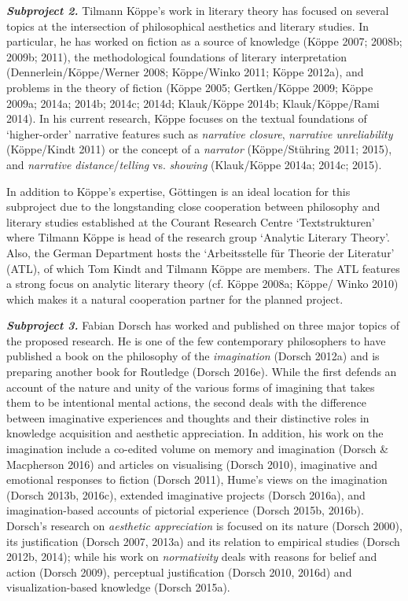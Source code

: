 \vspace{.2cm}
\noindent \textbf{\emph{Subproject 2.}} Tilmann K\"oppe's work in literary theory has focused on several topics at the intersection of philosophical aesthetics and literary studies. In particular, he has worked on fiction as a source of knowledge (K\"oppe 2007; 2008b; 2009b; 2011), the methodological foundations of literary interpretation (Dennerlein/K\"oppe/Werner 2008; K\"oppe/Winko 2011; K\"oppe 2012a), and problems in the theory of fiction (K\"oppe 2005; Gertken/K\"oppe 2009; K\"oppe 2009a; 2014a; 2014b; 2014c; 2014d; Klauk/K\"oppe 2014b; Klauk/K\"oppe/Rami 2014). In his current research, K\"oppe focuses on the textual foundations of `higher-order' narrative features such as \emph{narrative closure}, \emph{narrative unreliability} (K\"oppe/Kindt 2011) or the concept of a \emph{narrator} (K\"oppe/St\"uhring 2011; 2015), and \emph{narrative distance}/\emph{telling} vs. \emph{showing} (Klauk/K\"oppe 2014a; 2014c; 2015). 

In addition to K\"oppe's expertise, G\"ottingen is an ideal location for this subproject due to the longstanding close cooperation between philosophy and literary studies established at the Courant Research Centre `Textstrukturen' where Tilmann K\"oppe is head of the research group `Analytic Literary Theory'. Also, the German Department hosts the `Arbeitsstelle f\"ur Theorie der Literatur' (ATL), of which Tom Kindt and Tilmann K\"oppe are members. The ATL features a strong focus on analytic literary theory (cf. K\"oppe 2008a; K\"oppe/ Winko 2010) which makes it a natural cooperation partner for the planned project.

\vspace{.2cm}
\noindent \textbf{\emph{Subproject 3.}} Fabian Dorsch has worked and published on three major topics of the proposed research. He is one of the few contemporary philosophers to have published a book on the philosophy of the \emph{imagination} (Dorsch 2012a) and is preparing another book for Routledge (Dorsch 2016e). While the first defends an account of the nature and unity of the various forms of imagining that takes them to be intentional mental actions, the second deals with the difference between imaginative experiences and thoughts and their distinctive roles in knowledge acquisition and aesthetic appreciation. In addition, his work on the imagination include a co-edited volume on memory and imagination (Dorsch \& Macpherson 2016) and articles on visualising (Dorsch 2010), imaginative and emotional responses to fiction (Dorsch 2011), Hume's views on the imagination (Dorsch 2013b, 2016c), extended imaginative projects (Dorsch 2016a), and imagination-based accounts of pictorial experience (Dorsch 2015b, 2016b). Dorsch's research on \emph{aesthetic appreciation} is focused on its nature (Dorsch 2000), its justification (Dorsch 2007, 2013a) and its relation to empirical studies (Dorsch 2012b, 2014); while his work on \emph{normativity} deals with reasons for belief and action (Dorsch 2009), perceptual justification (Dorsch 2010, 2016d) and visualization-based knowledge (Dorsch 2015a).

